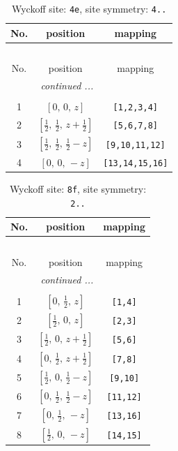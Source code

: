 \documentclass[fleqn,8pt]{jsarticle}
\begin{document}
\renewcommand{\arraystretch}{1.2}
\begin{longtable}{ccc}
\caption{Wyckoff site: {\tt 4e}, site symmetry: {\tt 4..}}
 \\
 \hline \hline
No. & position & mapping \\ \hline \endfirsthead

\multicolumn{2}{l}{\tablename\ \thetable{}} \\
 \hline \hline
No. & position & mapping \\ \hline \endhead

 \hline \hline
\multicolumn{2}{r}{\footnotesize\it continued ...} \\ \endfoot

 \hline \hline
\multicolumn{2}{r}{} \\ \endlastfoot

1 & $\left[ 0,\, 0,\, z \right]$ & {\tt [1,2,3,4]} \\ \hline
2 & $\left[ \frac{1}{2},\, \frac{1}{2},\, z + \frac{1}{2} \right]$ & {\tt [5,6,7,8]} \\ \hline
3 & $\left[ \frac{1}{2},\, \frac{1}{2},\, \frac{1}{2} - z \right]$ & {\tt [9,10,11,12]} \\ \hline
4 & $\left[ 0,\, 0,\, - z \right]$ & {\tt [13,14,15,16]} \\
\end{longtable}
\renewcommand{\arraystretch}{1.2}
\begin{longtable}{ccc}
\caption{Wyckoff site: {\tt 8f}, site symmetry: {\tt 2..}}
 \\
 \hline \hline
No. & position & mapping \\ \hline \endfirsthead

\multicolumn{2}{l}{\tablename\ \thetable{}} \\
 \hline \hline
No. & position & mapping \\ \hline \endhead

 \hline \hline
\multicolumn{2}{r}{\footnotesize\it continued ...} \\ \endfoot

 \hline \hline
\multicolumn{2}{r}{} \\ \endlastfoot

1 & $\left[ 0,\, \frac{1}{2},\, z \right]$ & {\tt [1,4]} \\ \hline
2 & $\left[ \frac{1}{2},\, 0,\, z \right]$ & {\tt [2,3]} \\ \hline
3 & $\left[ \frac{1}{2},\, 0,\, z + \frac{1}{2} \right]$ & {\tt [5,6]} \\ \hline
4 & $\left[ 0,\, \frac{1}{2},\, z + \frac{1}{2} \right]$ & {\tt [7,8]} \\ \hline
5 & $\left[ \frac{1}{2},\, 0,\, \frac{1}{2} - z \right]$ & {\tt [9,10]} \\ \hline
6 & $\left[ 0,\, \frac{1}{2},\, \frac{1}{2} - z \right]$ & {\tt [11,12]} \\ \hline
7 & $\left[ 0,\, \frac{1}{2},\, - z \right]$ & {\tt [13,16]} \\ \hline
8 & $\left[ \frac{1}{2},\, 0,\, - z \right]$ & {\tt [14,15]} \\
\end{longtable}
\end{document}
